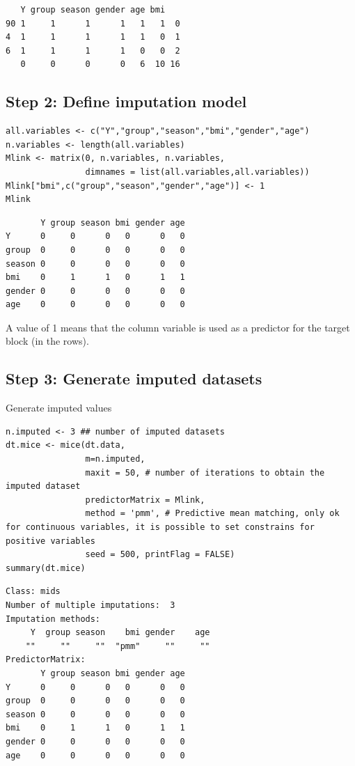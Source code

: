 \documentclass[12pt]{article}
\begin{document}
\begin{verbatim}
   Y group season gender age bmi   
90 1     1      1      1   1   1  0
4  1     1      1      1   1   0  1
6  1     1      1      1   0   0  2
   0     0      0      0   6  10 16
\end{verbatim}

\clearpage

\subsection{Step 2: Define imputation model}
\label{sec:org7423ff7}

\lstset{language=r,label= ,caption= ,captionpos=b,numbers=none}
\begin{lstlisting}
all.variables <- c("Y","group","season","bmi","gender","age")
n.variables <- length(all.variables)
Mlink <- matrix(0, n.variables, n.variables,
				dimnames = list(all.variables,all.variables))
Mlink["bmi",c("group","season","gender","age")] <- 1
Mlink
\end{lstlisting}

\begin{verbatim}
       Y group season bmi gender age
Y      0     0      0   0      0   0
group  0     0      0   0      0   0
season 0     0      0   0      0   0
bmi    0     1      1   0      1   1
gender 0     0      0   0      0   0
age    0     0      0   0      0   0
\end{verbatim}

A value of 1 means that the column variable is used as a predictor for
 the target block (in the rows).

\clearpage

\subsection{Step 3: Generate imputed datasets}
\label{sec:org462158b}
Generate imputed values
\lstset{language=r,label= ,caption= ,captionpos=b,numbers=none}
\begin{lstlisting}
n.imputed <- 3 ## number of imputed datasets
dt.mice <- mice(dt.data,
				m=n.imputed, 
				maxit = 50, # number of iterations to obtain the imputed dataset
				predictorMatrix = Mlink,
				method = 'pmm', # Predictive mean matching, only ok for continuous variables, it is possible to set constrains for positive variables
				seed = 500, printFlag = FALSE)
summary(dt.mice)
\end{lstlisting}

\begin{verbatim}
Class: mids
Number of multiple imputations:  3 
Imputation methods:
     Y  group season    bmi gender    age 
    ""     ""     ""  "pmm"     ""     "" 
PredictorMatrix:
       Y group season bmi gender age
Y      0     0      0   0      0   0
group  0     0      0   0      0   0
season 0     0      0   0      0   0
bmi    0     1      1   0      1   1
gender 0     0      0   0      0   0
age    0     0      0   0      0   0
\end{verbatim}
\end{document}
